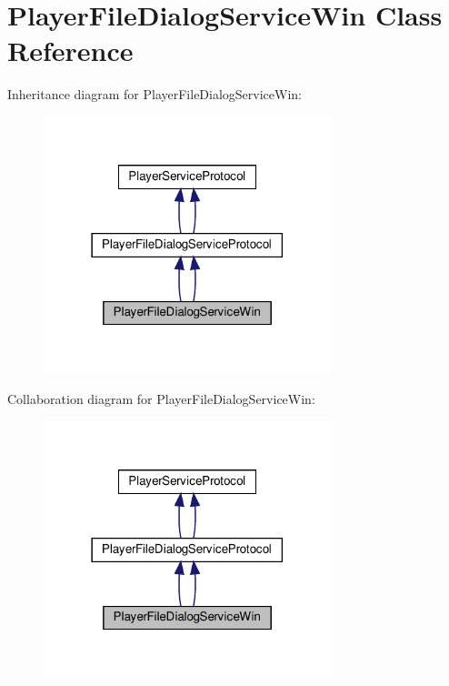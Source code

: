 \hypertarget{classPlayerFileDialogServiceWin}{}\section{Player\+File\+Dialog\+Service\+Win Class Reference}
\label{classPlayerFileDialogServiceWin}


Inheritance diagram for Player\+File\+Dialog\+Service\+Win\+:
\nopagebreak
\begin{figure}[H]
\begin{center}
\leavevmode
\includegraphics[width=237pt]{classPlayerFileDialogServiceWin__inherit__graph}
\end{center}
\end{figure}


Collaboration diagram for Player\+File\+Dialog\+Service\+Win\+:
\nopagebreak
\begin{figure}[H]
\begin{center}
\leavevmode
\includegraphics[width=237pt]{classPlayerFileDialogServiceWin__coll__graph}
\end{center}
\end{figure}
